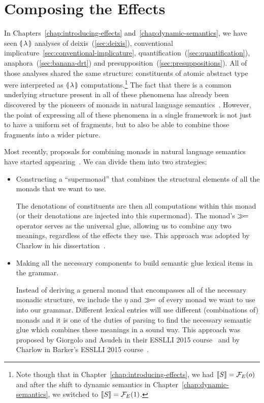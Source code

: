 \chapter{Composing the Effects}
\label{chap:composing-effects}

In Chapters~\ref{chap:introducing-effects}
and~\ref{chap:dynamic-semantics}, we have seen ${\llparenthesis \, \lambda \, \rrparenthesis}$ analyses of
deixis~(\ref{sec:deixis}), conventional
implicature~\ref{sec:conventional-implicature},
quantification~(\ref{sec:quantification}), anaphora~(\ref{sec:banana-drt})
and presupposition~(\ref{sec:presuppositions}). All of those analyses
shared the same structure: constituents of atomic abstract type were
interpreted as ${\llparenthesis \, \lambda \, \rrparenthesis}$ computations.\footnote{Note though that in
  Chapter~\ref{chap:introducing-effects}, we had $\llbracket S \rrbracket = \mathcal{F}_E(o)$ and
  after the shift to dynamic semantics in
  Chapter~\ref{chap:dynamic-semantics}, we switched to
  $\llbracket S \rrbracket = \mathcal{F}_E(1)$.} The fact that there is a common underlying
structure present in all of these phenomena has already been discovered by
the pioneers of monads in natural language
semantics~\cite{shan2002monads,charlow2014semantics,giorgolo2015natural,barker2015monads}. However,
the point of expressing all of these phenomena in a single framework is not
just to have a uniform set of fragments, but to also be able to combine
those fragments into a wider picture.

Most recently, proposals for combining monads in natural language semantics
have started
appearing~\cite{charlow2014semantics,giorgolo2015natural,barker2015monads}. We
can divide them into two strategies:

\begin{itemize}
\item Constructing a ``supermonad'' that combines the structural elements
  of all the monads that we want to use.

  The denotations of constituents are then all computations within this
  monad (or their denotations are injected into this supermonad). The
  monad's $\mathbin{\gg\!=}$ operator serves as the universal glue, allowing us to
  combine any two meanings, regardless of the effects they use. This
  approach was adopted by Charlow in his
  dissertation~\cite{charlow2014semantics}.
\item Making all the necessary components to build semantic glue lexical
  items in the grammar.

  Instead of deriving a general monad that encompasses all of the necessary
  monadic structure, we include the $\eta$ and $\mathbin{\gg\!=}$ of every monad we
  want to use into our grammar. Different lexical entries will use
  different (combinations of) monads and it is one of the duties of parsing
  to find the necessary semantic glue which combines these meanings in a
  sound way. This approach was proposed by Giorgolo and Asudeh in their
  ESSLLI 2015 course~\cite{giorgolo2015natural} and by Charlow in Barker's
  ESSLLI 2015 course~\cite{barker2015monads}.
\end{itemize}


